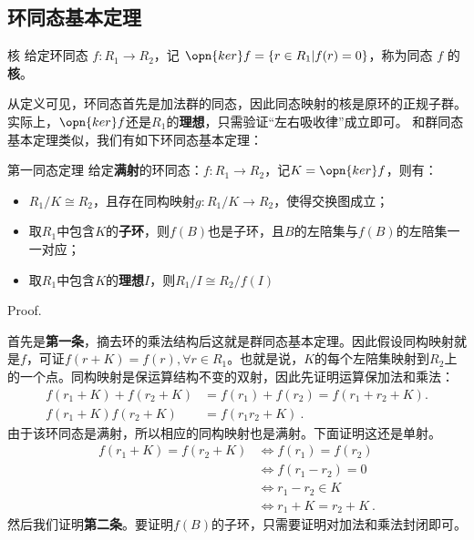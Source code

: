 \subsection{环同态基本定理}

\begin{definition}{核}
给定环同态 $f:R_1\rightarrow R_2$，记 $\opn{ker}f=\{r\in R_1|f(r)=0\}$，称为同态 $f$ 的\textbf{核}。
\end{definition}

从定义可见，环同态首先是加法群的同态，因此同态映射的核是原环的正规子群。实际上，$\opn{ker} f$还是$R_1$的\textbf{理想}，只需验证“左右吸收律”成立即可。
和群同态基本定理类似，我们有如下环同态基本定理：

\begin{theorem}{第一同态定理}
给定\textbf{满射}的环同态：$f:R_1\rightarrow R_2$，记$K= \opn{ker}f$，则有：
\begin{itemize}
\item $R_1/K\cong R_2$，且存在同构映射$g:R_1/K\rightarrow R_2$，使得交换图成立；
\item 取$R_1$中包含$K$的\textbf{子环}，则$f(B)$也是子环，且$B$的左陪集与$f(B)$的左陪集一一对应；
\item 取$R_1$中包含$K$的\textbf{理想}$I$，则$R_1/I \cong R_2/f(I)$
\end{itemize}
\end{theorem}
Proof.

首先是\textbf{第一条}，摘去环的乘法结构后这就是群同态基本定理。因此假设同构映射就是$f$，可证$f(r+K)=f(r),\forall r\in R_1$。也就是说，$K$的每个左陪集映射到$R_2$上的一个点。同构映射是保运算结构不变的双射，因此先证明运算保加法和乘法：
\begin{equation}
\begin{aligned}
f(r_1 +K)+f(r_2 +K)&=f(r_1)+f(r_2)=f(r_1+r_2+K).\\
f(r_1 +K)f(r_2 +K)&=f(r_1 r_2+K)~.
\end{aligned}
\end{equation}
由于该环同态是满射，所以相应的同构映射也是满射。下面证明这还是单射。
\begin{equation}
\begin{aligned}
f(r_1+K)=f(r_2+K)&\Leftrightarrow f(r_1)=f(r_2)\\
&\Leftrightarrow  f(r_1-r_2)=0\\
&\Leftrightarrow r_1-r_2\in K\\
&\Leftrightarrow r_1+K=r_2+K~.
\end{aligned}
\end{equation}
然后我们证明\textbf{第二条}。要证明$f(B)$的子环，只需要证明对加法和乘法封闭即可。

